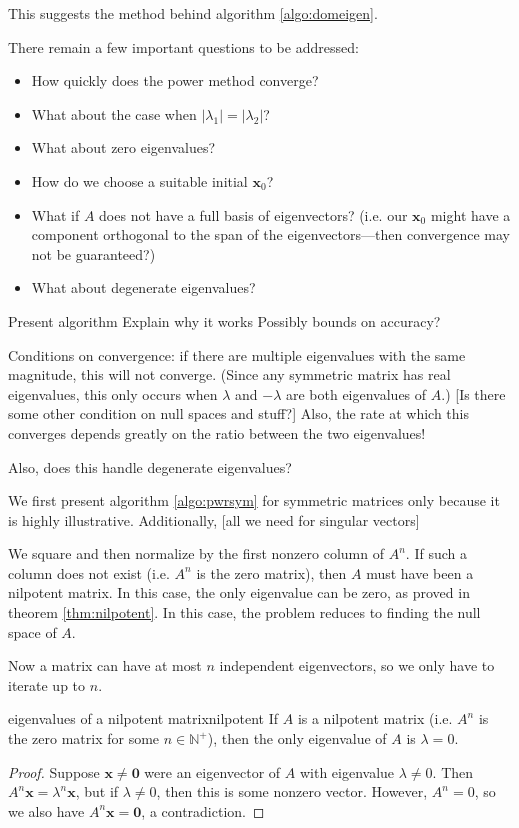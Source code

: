 \documentclass{article}
\let\vec\mathbf
\begin{document}
This suggests the method behind algorithm \ref{algo:domeigen}.

There remain a few important questions to be addressed:
\begin{itemize}
  \item How quickly does the power method converge?
  \item What about the case when $|\lambda_1| = |\lambda_2|$?
  \item What about zero eigenvalues?
  \item How do we choose a suitable initial $\vec{x}_0$?
  \item What if $A$ does not have a full basis of eigenvectors? (i.e. our $\vec{x}_0$ might have a component orthogonal to the span of the eigenvectors---then convergence may not be guaranteed?)
  \item What about degenerate eigenvalues?
\end{itemize}


Present algorithm
Explain why it works
Possibly bounds on accuracy?

Conditions on convergence: if there are multiple eigenvalues with the same magnitude, this will not converge. (Since any symmetric matrix has real eigenvalues, this only occurs when $\lambda$ and $-\lambda$ are both eigenvalues of $A$.) [Is there some other condition on null spaces and stuff?] Also, the rate at which this converges depends greatly on the ratio between the two eigenvalues!

Also, does this handle degenerate eigenvalues?

We first present algorithm \ref{algo:pwrsym} for symmetric matrices only because it is highly illustrative. Additionally, [all we need for singular vectors]

We square and then normalize by the first nonzero column of $A^n$. If such a column does not exist (i.e. $A^n$ is the zero matrix), then $A$ must have been a nilpotent matrix. In this case, the only eigenvalue can be zero, as proved in theorem \ref{thm:nilpotent}. In this case, the problem reduces to finding the null space of $A$.

Now a matrix can have at most $n$ independent eigenvectors, so we only have to iterate up to $n$.

\begin{theorem}{eigenvalues of a nilpotent matrix}{nilpotent}
  If $A$ is a nilpotent matrix (i.e. $A^n$ is the zero matrix for some $n \in \mathbb{N}^+$), then the only eigenvalue of $A$ is $\lambda = 0$.
  \begin{proof}
    Suppose $\vec{x} \neq \vec{0}$ were an eigenvector of $A$ with eigenvalue $\lambda \neq 0$. Then $A^n\vec{x} = \lambda^n\vec{x}$, but if $\lambda \neq 0$, then this is some nonzero vector. However, $A^n = 0$, so we also have $A^n\vec{x} = \vec{0}$, a contradiction.
  \end{proof}
\end{theorem}
\end{document}
